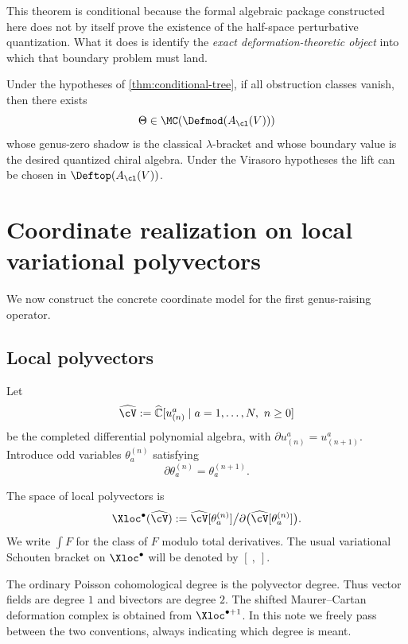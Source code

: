 \begin{remark}
This theorem is conditional because the formal algebraic package constructed here does not
by itself prove the existence of the half-space perturbative quantization. What it does is
identify the \emph{exact deformation-theoretic object} into which that boundary problem
must land.
\end{remark}

\begin{corollary}
Under the hypotheses of \cref{thm:conditional-tree}, if all obstruction classes vanish,
then there exists
\[
\Theta\in \MC(\Defmod(A_{\cl}(V)))
\]
whose genus-zero shadow is the classical $\lambda$-bracket and whose boundary value is the
desired quantized chiral algebra. Under the Virasoro hypotheses the lift can be chosen in
$\Deftop(A_{\cl}(V))$.
\end{corollary}

\section{Coordinate realization on local variational polyvectors}

We now construct the concrete coordinate model for the first genus-raising operator.

\subsection{Local polyvectors}

Let
\[
\widehat{\cV}:=
\widehat{\mathbb C}[u^a_{(n)}\mid a=1,\dots,N,\ n\ge 0]
\]
be the completed differential polynomial algebra, with $\partial u^a_{(n)}=u^a_{(n+1)}$.
Introduce odd variables $\theta_a^{(n)}$ satisfying
\[
\partial \theta_a^{(n)}=\theta_a^{(n+1)}.
\]

\begin{definition}
The space of local polyvectors is
\[
\Xloc^\bullet(\widehat{\cV})
:=
\widehat{\cV}[\theta_a^{(n)}]\big/\partial\big(\widehat{\cV}[\theta_a^{(n)}]\big).
\]
We write $\int F$ for the class of $F$ modulo total derivatives. The usual variational
Schouten bracket on $\Xloc^\bullet$ will be denoted by $[\ ,\ ]$.
\end{definition}

\begin{remark}
The ordinary Poisson cohomological degree is the polyvector degree. Thus vector fields are
degree $1$ and bivectors are degree $2$. The shifted Maurer--Cartan deformation complex is
obtained from $\Xloc^{\bullet+1}$. In this note we freely pass between the two conventions,
always indicating which degree is meant.
\end{remark}


